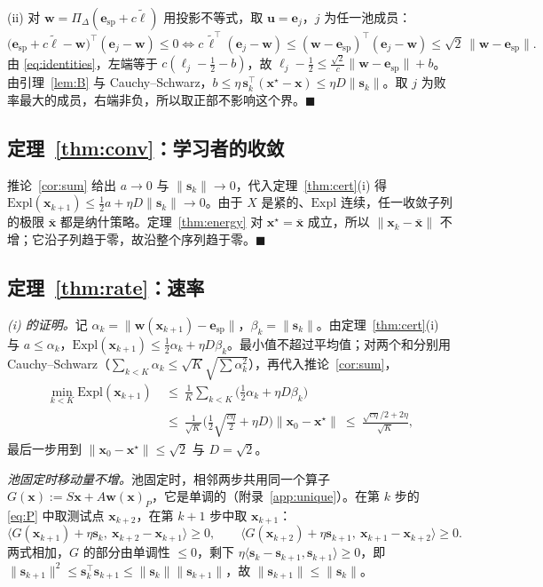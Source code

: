 \documentclass{article}
\theoremstyle{plain}
\theoremstyle{remark}
\newcommand{\Expl}{\mathrm{Expl}}
\newcommand{\Proj}{\Pi}
\newcommand{\simplex}{\Delta}
\newcommand{\bx}{{\bm{x}}}
\newcommand{\bw}{{\bm{w}}}
\newcommand{\bu}{{\bm{u}}}
\newcommand{\be}{{\bm{e}}}
\newcommand{\bell}{{\bm{\ell}}}
\newcommand{\aug}{\tilde{\bell}}
\newcommand{\xs}{\bx^{\star}}
\newcommand{\dx}{{\bm{s}}}
\newcommand{\esp}{\be_{\mathrm{sp}}}
\begin{document}
(ii) 对 $\bw=\Proj_\simplex(\esp+c\aug)$ 用投影不等式，取 $\bu=\be_j$，$j$ 为任一池成员：
\[
\big(\esp+c\aug-\bw\big)^\top(\be_j-\bw)\le0\iff c\,\aug^\top(\be_j-\bw)\le(\bw-\esp)^\top(\be_j-\bw)\le\sqrt2\,\|\bw-\esp\| .
\]
由 \eqref{eq:identities}，左端等于 $c(\ell_j-\tfrac12-b)$，故 $\ell_j-\tfrac12\le\frac{\sqrt2}c\|\bw-\esp\|+b$。由引理~\ref{lem:B} 与 Cauchy--Schwarz，$b\le\eta\,\dx_k^\top(\xs-\bx)\le\eta D\|\dx_k\|$。取 $j$ 为败率最大的成员，右端非负，所以取正部不影响这个界。\hfill$\blacksquare$

\subsection{定理~\ref{thm:conv}：学习者的收敛}
\label{app:conv}

推论~\ref{cor:sum} 给出 $a\to0$ 与 $\|\dx_k\|\to0$，代入定理~\ref{thm:cert}(i) 得 $\Expl(\bx_{k+1})\le\tfrac12a+\eta D\|\dx_k\|\to0$。由于 $X$ 是紧的、$\Expl$ 连续，任一收敛子列的极限 $\bar \bx$ 都是纳什策略。定理~\ref{thm:energy} 对 $\xs=\bar \bx$ 成立，所以 $\|\bx_k-\bar \bx\|$ 不增；它沿子列趋于零，故沿整个序列趋于零。\hfill$\blacksquare$

\subsection{定理~\ref{thm:rate}：速率}
\label{app:rate}

\textit{(i) 的证明。}记 $\alpha_k=\|\bw(\bx_{k+1})-\esp\|$，$\beta_k=\|\dx_k\|$。由定理~\ref{thm:cert}(i) 与 $a\le\alpha_k$，$\Expl(\bx_{k+1})\le\tfrac12\alpha_k+\eta D\beta_k$。最小值不超过平均值；对两个和分别用 Cauchy--Schwarz（$\sum_{k<K}\alpha_k\le\sqrt K\sqrt{\sum\alpha_k^2}$），再代入推论~\ref{cor:sum}，
\begin{align*}
\min_{k<K}\Expl(\bx_{k+1})\ &\le\ \frac1K\sum_{k<K}\Big(\tfrac12\alpha_k+\eta D\beta_k\Big)\\
&\le\ \frac{1}{\sqrt K}\Big(\tfrac12\sqrt{\tfrac{c\eta}{2}}+\eta D\Big)\|\bx_0-\xs\|\ \le\ \frac{\sqrt{c\eta}/2+2\eta}{\sqrt K},
\end{align*}
最后一步用到 $\|\bx_0-\xs\|\le\sqrt2$ 与 $D=\sqrt2$。

\textit{池固定时移动量不增。}池固定时，相邻两步共用同一个算子 $G(\bx):=S\bx+A\bw(\bx)_P$，它是单调的（附录~\ref{app:unique}）。在第 $k$ 步的 \eqref{eq:P} 中取测试点 $\bx_{k+2}$，在第 $k+1$ 步中取 $\bx_{k+1}$：
\[
\langle G(\bx_{k+1})+\eta\dx_k,\ \bx_{k+2}-\bx_{k+1}\rangle\ge0,\qquad\langle G(\bx_{k+2})+\eta\dx_{k+1},\ \bx_{k+1}-\bx_{k+2}\rangle\ge0 .
\]
两式相加，$G$ 的部分由单调性 $\le0$，剩下 $\eta\langle\dx_k-\dx_{k+1},\dx_{k+1}\rangle\ge0$，即 $\|\dx_{k+1}\|^2\le\dx_k^\top\dx_{k+1}\le\|\dx_k\|\|\dx_{k+1}\|$，故 $\|\dx_{k+1}\|\le\|\dx_k\|$。
\end{document}
